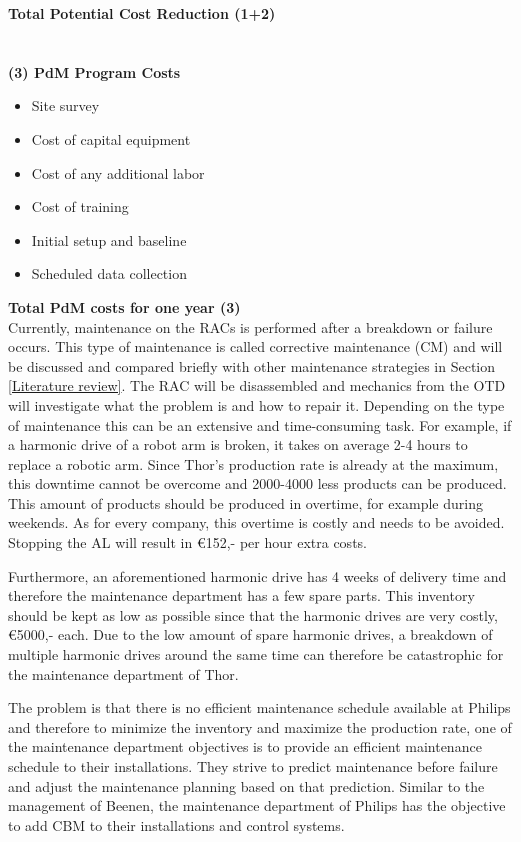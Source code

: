 \textbf{Total Potential Cost Reduction (1+2)}\\
\\
\\
\textbf{(3) PdM Program Costs}
\begin{itemize}
\item Site survey
\item Cost of capital equipment
\item Cost of any additional labor
\item Cost of training
\item Initial setup and baseline
\item Scheduled data collection 
\end{itemize}
\textbf{Total PdM costs for one year (3)}\\

Currently, maintenance on the RACs is performed after a breakdown or failure occurs. This type of maintenance is called corrective maintenance (CM) and will be discussed and compared briefly with other maintenance strategies in Section \ref{Literature review}. The RAC will be disassembled and mechanics from the OTD will investigate what the problem is and how to repair it. Depending on the type of maintenance this can be an extensive and time-consuming task. For example, if a harmonic drive of a robot arm is broken, it takes on average 2-4 hours to replace a robotic arm. Since Thor's production rate is already at the maximum, this downtime cannot be overcome and 2000-4000 less products can be produced. This amount of products should be produced in overtime, for example during weekends. As for every company, this overtime is costly and needs to be avoided. Stopping the AL will result in €152,- per hour extra costs.  

Furthermore, an aforementioned harmonic drive has 4 weeks of delivery time and therefore the maintenance department has a few spare parts. This inventory should be kept as low as possible since that the harmonic drives are very costly, €5000,- each. Due to the low amount of spare harmonic drives, a breakdown of multiple harmonic drives around the same time can therefore be catastrophic for the maintenance department of Thor. 

The problem is that there is no efficient maintenance schedule available at Philips and therefore to minimize the inventory and maximize the production rate, one of the maintenance department objectives is to provide an efficient maintenance schedule to their installations. They strive to predict maintenance before failure and adjust the maintenance planning based on that prediction. Similar to the management of Beenen, the maintenance department of Philips has the objective to add CBM to their installations and control systems. 

